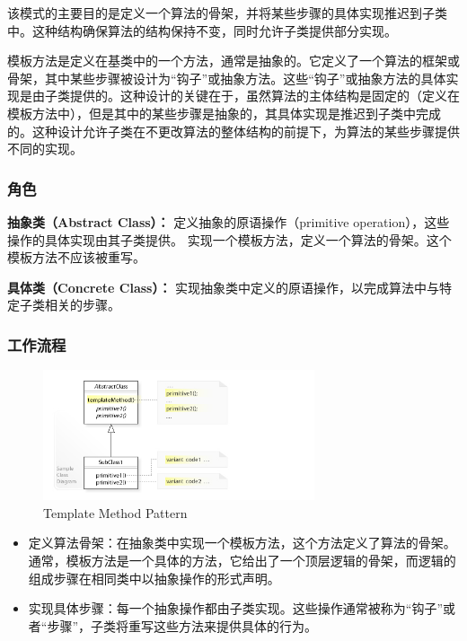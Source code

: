 该模式的主要目的是定义一个算法的骨架，并将某些步骤的具体实现推迟到子类中。这种结构确保算法的结构保持不变，同时允许子类提供部分实现。

模板方法是定义在基类中的一个方法，通常是抽象的。它定义了一个算法的框架或骨架，其中某些步骤被设计为“钩子”或抽象方法。这些“钩子”或抽象方法的具体实现是由子类提供的。这种设计的关键在于，虽然算法的主体结构是固定的（定义在模板方法中），但是其中的某些步骤是抽象的，其具体实现是推迟到子类中完成的。这种设计允许子类在不更改算法的整体结构的前提下，为算法的某些步骤提供不同的实现。

\subsubsection{角色}

\textbf{抽象类（Abstract Class）：}
定义抽象的原语操作（primitive operation），这些操作的具体实现由其子类提供。
实现一个模板方法，定义一个算法的骨架。这个模板方法不应该被重写。

\textbf{具体类（Concrete Class）：}
实现抽象类中定义的原语操作，以完成算法中与特定子类相关的步骤。

\subsubsection{工作流程}

\begin{figure}[h]
    \centering
    \includegraphics[width=8cm]{res/W3sDesign_Template_Method_Design_Pattern_UML.jpg}
    \caption{Template Method Pattern}
\end{figure}

\begin{itemize}
	\item 定义算法骨架：在抽象类中实现一个模板方法，这个方法定义了算法的骨架。通常，模板方法是一个具体的方法，它给出了一个顶层逻辑的骨架，而逻辑的组成步骤在相同类中以抽象操作的形式声明。
	\item 实现具体步骤：每一个抽象操作都由子类实现。这些操作通常被称为“钩子”或者“步骤”，子类将重写这些方法来提供具体的行为。
\end{itemize}

